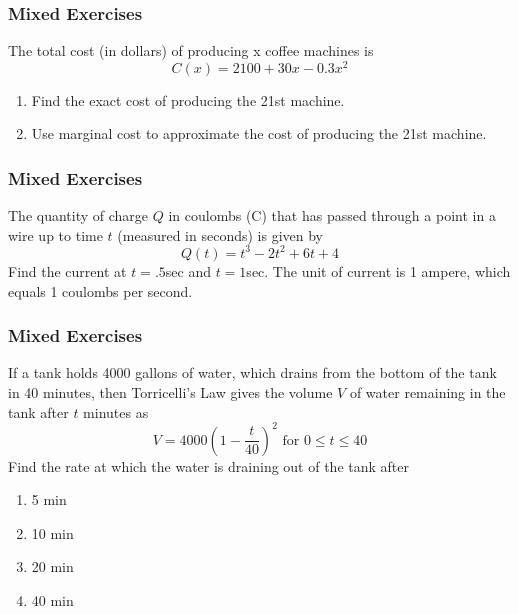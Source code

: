 \documentclass[xcolor=dvipsnames]{beamer}
\begin{document}
\begin{frame}
  \frametitle{Mixed Exercises}
  {\ubung} The total cost (in dollars) of producing x coffee machines is
  \begin{equation}
    \label{eq:egaireil}
    C(x)=2100+30x-0.3x^{2}
  \end{equation}
  \begin{enumerate}
  \item Find the exact cost of producing the 21st machine.
  \item Use marginal cost to approximate the cost of producing the 21st machine.
  \end{enumerate}
\end{frame}

\begin{frame}
  \frametitle{Mixed Exercises}
  {\ubung} The quantity of charge $Q$ in coulombs (C) that has passed through a
  point in a wire up to time $t$ (measured in seconds) is given by
  \begin{equation}
    \label{eq:iehahphi}
    Q(t)=t^{3}−2t^{2}+6t+4  
  \end{equation}
Find the current at $t=.5$sec and $t=1$sec. The unit of current is 1
ampere, which equals 1 coulombs per second.
\end{frame}

\begin{frame}
  \frametitle{Mixed Exercises}
  {\ubung} If a tank holds 4000 gallons of water, which drains from the bottom
  of the tank in 40 minutes, then Torricelli's Law gives the volume $V$
  of water remaining in the tank after $t$ minutes as
  \begin{equation}
    \label{eq:oothaich}
  V=4000\left(1−\frac{t}{40}\right)^{2}\mbox{ for }0\leq{}t\leq{}40  
  \end{equation}
  Find the rate at which the water is draining out of the tank after
  \begin{enumerate}
  \item 5 min
  \item 10 min
  \item 20 min
  \item 40 min
  \end{enumerate}
\end{frame}
\end{document}
